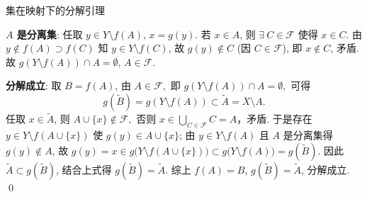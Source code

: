 
\begin{frame}{集在映射下的分解引理}

{\color{red}} \textbf{$A$ 是分离集}: 任取 $y \in Y \setminus f(A)$, $x = g(y)$. 若 $x \in A$, 则 $\exists ~ C \in \mathscr{F}$ 使得 $x \in C$. 由 $y \notin f(A) \supset f(C)$ 知 $y \in Y \setminus f(C)$, 故 $g(y) \notin C$ (因 $C \in \mathscr{F}$), 即 $x \notin C$, 矛盾. 故 $g(Y \setminus f(A)) \cap A = \emptyset$, $A \in \mathscr{F}$.

\pause
\vspace{1em}

{\color{red}} \textbf{分解成立}: 取 $B = f(A)$, 由 $A \in \mathscr{F},$ 即 $g(Y \setminus f(A)) \cap A = \emptyset,$ 可得
\[
g(\widetilde{B}) = g(Y \setminus f(A)) \subset \widetilde{A} = X \setminus A.
\]
任取 $x \in \widetilde{A}$, 则 $A \cup \{x\} \notin \mathscr{F},$ 否则 $x \in \bigcup_{C \in \mathscr{F}} C = A$，矛盾. 于是存在 $y \in Y \setminus f(A \cup \{x\})$ 使 $g(y) \in A \cup \{x\}$; 由 $y \in Y \setminus f(A)$ 且 $A$ 是分离集得 $g(y) \notin A$, 故 $g(y) = x \in g\big(Y \setminus f(A \cup \{x\})\big) \subset g\big(Y \setminus f(A)\big) = g(\widetilde{B})$. 因此 $\widetilde{A} \subset g(\widetilde{B})$, 结合上式得 $g(\widetilde{B}) = \widetilde{A}$. 综上 $f(A) = B$, $g(\widetilde{B}) = \widetilde{A}$, 分解成立.
\qed

\end{frame}



